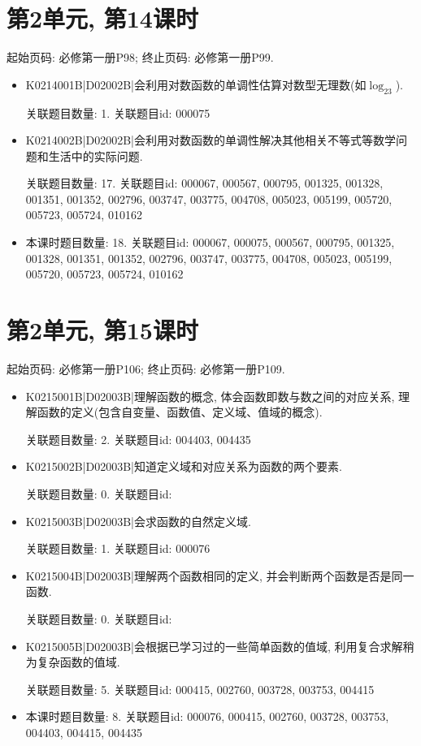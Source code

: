 \section*{第2单元, 第14课时}
起始页码: 必修第一册P98; 终止页码: 必修第一册P99.
\begin{itemize}
\item K0214001B|D02002B|会利用对数函数的单调性估算对数型无理数(如$\log_23$).

关联题目数量: 1. 关联题目id: 000075

\item K0214002B|D02002B|会利用对数函数的单调性解决其他相关不等式等数学问题和生活中的实际问题.

关联题目数量: 17. 关联题目id: 000067, 000567, 000795, 001325, 001328, 001351, 001352, 002796, 003747, 003775, 004708, 005023, 005199, 005720, 005723, 005724, 010162

\item 本课时题目数量: 18. 关联题目id: 000067, 000075, 000567, 000795, 001325, 001328, 001351, 001352, 002796, 003747, 003775, 004708, 005023, 005199, 005720, 005723, 005724, 010162

\end{itemize}

\section*{第2单元, 第15课时}
起始页码: 必修第一册P106; 终止页码: 必修第一册P109.
\begin{itemize}
\item K0215001B|D02003B|理解函数的概念, 体会函数即数与数之间的对应关系, 理解函数的定义(包含自变量、函数值、定义域、值域的概念).

关联题目数量: 2. 关联题目id: 004403, 004435

\item K0215002B|D02003B|知道定义域和对应关系为函数的两个要素.

关联题目数量: 0. 关联题目id: 

\item K0215003B|D02003B|会求函数的自然定义域.

关联题目数量: 1. 关联题目id: 000076

\item K0215004B|D02003B|理解两个函数相同的定义, 并会判断两个函数是否是同一函数.

关联题目数量: 0. 关联题目id: 

\item K0215005B|D02003B|会根据已学习过的一些简单函数的值域, 利用复合求解稍为复杂函数的值域.

关联题目数量: 5. 关联题目id: 000415, 002760, 003728, 003753, 004415

\item 本课时题目数量: 8. 关联题目id: 000076, 000415, 002760, 003728, 003753, 004403, 004415, 004435

\end{itemize}


